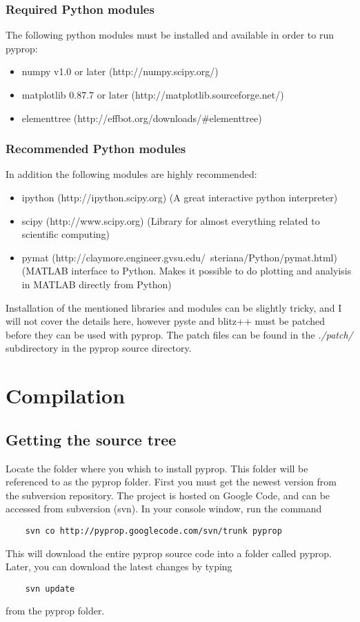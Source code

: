 \subsubsection*{Required Python modules}
The following python modules must be installed and available in order to run pyprop:
\begin{itemize}
\item numpy v1.0 or later (http://numpy.scipy.org/)
\item matplotlib 0.87.7 or later (http://matplotlib.sourceforge.net/)
\item elementtree (http://effbot.org/downloads/\#elementtree)
\end{itemize}
	
\subsubsection*{Recommended Python modules}
In addition the following modules are highly recommended:
\begin{itemize}
\item ipython (http://ipython.scipy.org) (A great interactive python interpreter)
\item scipy (http://www.scipy.org) (Library for almost everything related to scientific computing)
\item pymat (http://claymore.engineer.gvsu.edu/~steriana/Python/pymat.html) (MATLAB interface to Python. 
	Makes it possible to do plotting and analyisis in MATLAB directly from Python)
\end{itemize}

Installation of the mentioned libraries and modules can be slightly tricky, and I will not cover the details here, 
however pyste and blitz++ must be patched before they can be used with pyprop. The patch files can be found in 
the \textit{./patch/} subdirectory in the pyprop source directory.

\section{Compilation}
\subsection*{Getting the source tree}
Locate the folder where you whish to install pyprop. This folder will be referenced to as the pyprop folder.
First you must get the newest version from the subversion repository. The project is hosted on Google Code, and 
can be accessed from subversion (svn). In your console window, run the command
\begin{verbatim}
	svn co http://pyprop.googlecode.com/svn/trunk pyprop
\end{verbatim}
This will download the entire pyprop source code into a folder called pyprop. Later, you can download the latest
changes by typing
\begin{verbatim}
	svn update
\end{verbatim}
from the pyprop folder.


